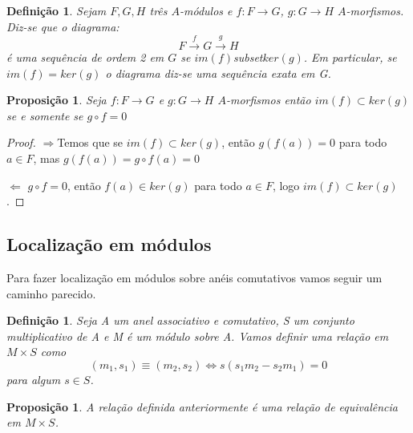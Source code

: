 \documentclass[10pt,a4paper]{article}
\newtheorem{proposition}[theorem]{Proposição}
\newtheorem{definition}[theorem]{Definição}
\begin{document}
\begin{definition}
	Sejam $F, G, H$ três $A$-módulos e $f:F\rightarrow G$, $g:G\rightarrow H$ $A$-morfismos. Diz-se que o diagrama:
	$$F \xrightarrow{f} G \xrightarrow{g}
	H$$
	é uma sequência de ordem 2 em $G$ se $im(f)$subset$ ker(g)$.
	Em particular, se $im(f)=ker(g)$ o diagrama diz-se uma sequência exata em G.
\end{definition}

\begin{proposition}
	Seja $f:F \rightarrow G$ e $g:G \rightarrow H$ $A$-morfismos então
	$im(f)\subset ker(g)$ se e somente se $g \circ f =0$
\end{proposition}
\begin{proof}
	$\Rightarrow$Temos que se	
	$im(f)\subset ker(g)$, então $g(f(a))=0$ para todo $a \in F$, mas $g(f(a))=g \circ f(a)=0$
	
	$\Leftarrow$ $g \circ f =0$, então $f(a) \in ker(g)$ para todo $a \in F$, logo $im(f) \subset ker(g)$.
\end{proof}


\subsection{Localização em módulos}

Para fazer localização em módulos sobre anéis comutativos vamos seguir um caminho parecido.

\begin{definition}
	Seja A um anel associativo e comutativo, S um conjunto multiplicativo de A e M é um módulo sobre A. Vamos definir uma relação em $M \times S$ como $$(m_1,s_1) \equiv (m_2, s_2) \Leftrightarrow s(s_1m_2-s_2m_1)=0$$ para algum  $s \in S$.
\end{definition}

\begin{proposition}
	A relação definida anteriormente é uma relação de equivalência em $M \times S$.
\end{proposition}
\end{document}
